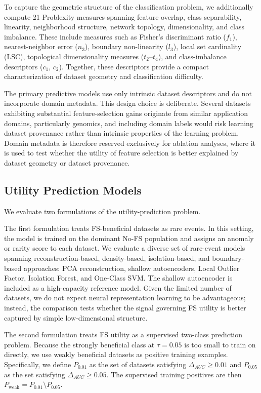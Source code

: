 \documentclass[preprint,12pt,authoryear]{elsarticle}
\begin{document}
To capture the geometric structure of the classification problem, we additionally compute 21 Problexity measures spanning feature overlap, class separability, linearity, neighborhood structure, network topology, dimensionality, and class imbalance. These include measures such as Fisher’s discriminant ratio ($f_1$), nearest-neighbor error ($n_3$), boundary non-linearity ($l_3$), local set cardinality (LSC), topological dimensionality measures ($t_2$–$t_4$), and class-imbalance descriptors ($c_1$, $c_2$). Together, these descriptors provide a compact characterization of dataset geometry and classification difficulty.

The primary predictive models use only intrinsic dataset descriptors and do not incorporate domain metadata. This design choice is deliberate. Several datasets exhibiting substantial feature-selection gains originate from similar application domains, particularly genomics, and including domain labels would risk learning dataset provenance rather than intrinsic properties of the learning problem. Domain metadata is therefore reserved exclusively for ablation analyses, where it is used to test whether the utility of feature selection is better explained by dataset geometry or dataset provenance.



\subsection{Utility Prediction Models}
\label{sec:prediction_models}

We evaluate two formulations of the utility-prediction problem.

The first formulation treats FS-beneficial datasets as rare events. In this setting, the model is trained on the dominant No-FS population and assigns an anomaly or rarity score to each dataset. We evaluate a diverse set of rare-event models spanning reconstruction-based, density-based, isolation-based, and boundary-based approaches: PCA reconstruction, shallow autoencoders, Local Outlier Factor, Isolation Forest, and One-Class SVM. The shallow autoencoder is included as a high-capacity reference model. Given the limited number of datasets, we do not expect neural representation learning to be advantageous; instead, the comparison tests whether the signal governing FS utility is better captured by simple low-dimensional structure.

The second formulation treats FS utility as a supervised two-class prediction problem. Because the strongly beneficial class at $\tau=0.05$ is too small to train on directly, we use weakly beneficial datasets as positive training examples. Specifically, we define $P_{0.01}$ as the set of datasets satisfying $\Delta_{AUC} \ge 0.01$ and $P_{0.05}$ as the set satisfying $\Delta_{AUC} \ge 0.05$. The supervised training positives are then $P_{\mathrm{weak}} = P_{0.01} \setminus P_{0.05}$. 
\end{document}

